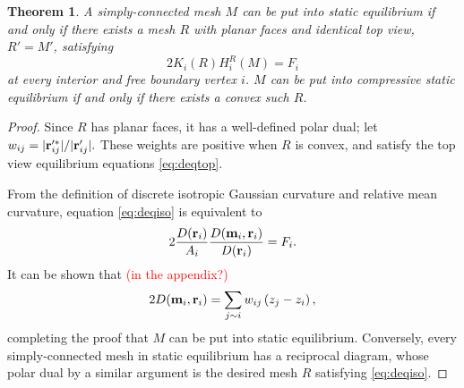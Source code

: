 \documentclass[annual]{acmsiggraph}
\newtheorem{theorem}{Theorem}
\newcommand{\todo}[1]{\textcolor{red}{#1}}
\begin{document}
\begin{theorem}
A simply-connected mesh $M$ can be put into static equilibrium if and only if there exists a mesh $R$ with planar faces and identical top view, $R' = M'$, satisfying
\begin{equation}
2 K_i(R) H^R_i(M) = F_i \label{eq:deqiso}
\end{equation}
at every interior and free boundary vertex $i$. $M$ can be put into compressive static equilibrium if and only if there exists a convex such $R$.
\end{theorem}
\begin{proof}
Since $R$ has planar faces, it has a well-defined polar dual; let $w_{ij} = |{\mathbf r}'^{*}_{ij}|/|{\mathbf r}'_{ij}|.$ These weights are positive when $R$ is convex, and satisfy the top view equilibrium equations \eqref{eq:deqtop}.

From the definition of discrete isotropic Gaussian curvature and relative mean curvature, equation \eqref{eq:deqiso} is equivalent to
\begin{equation*}
2 \frac{D({\mathbf r}_i)}{A_i} \frac{D({\mathbf m}_i, {\mathbf r}_i)}{D({\mathbf r}_i)} = F_i.
\end{equation*}
It can be shown that \todo{(in the appendix?)}
\begin{equation*}
2 D({\mathbf m}_i, {\mathbf r}_i) = \sum_{j\sim i} w_{ij} \left(z_j - z_i\right),
\end{equation*}
completing the proof that $M$ can be put into static equilibrium. Conversely, every simply-connected mesh in static equilibrium has a reciprocal diagram, whose polar dual by a similar argument is the desired mesh $R$ satisfying \eqref{eq:deqiso}.

\end{proof}
\end{document}

